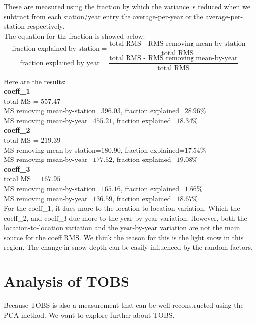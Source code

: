 \documentclass{article}
\begin{document}
These are measured using the fraction by which the variance is reduced when we subtract from each station/year entry the average-per-year or the average-per-station respectively. \\

The equation for the fraction is showed below:
\begin{equation*}
\textrm{fraction explained by station} = \frac{\textrm{total RMS - RMS removing mean-by-station}}{\textrm{total RMS}}
\end{equation*}
\begin{equation*}
\textrm{fraction explained by year} = \frac{\textrm{total RMS - RMS removing mean-by-year}}{\textrm{total RMS}}
\end{equation*}

Here are the results: \\

\textbf{coeff\_1} \\
total MS = $557.47$ \\
MS removing mean-by-station=$396.03$, fraction explained=$28.96\%$ \\
MS removing mean-by-year=$455.21$, fraction explained=$18.34\%$ \\

\textbf{coeff\_2} \\
total MS = $219.39$ \\
MS removing mean-by-station=$180.90$, fraction explained=$17.54\%$ \\
MS removing mean-by-year=$177.52$, fraction explained=$19.08\%$ \\

\textbf{coeff\_3} \\
total MS = $167.95$ \\
MS removing mean-by-station=$165.16$, fraction explained=$1.66\%$ \\
MS removing mean-by-year=$136.59$, fraction explained=$18.67\%$ \\

For the coeff\_1, it dues more to the location-to-location variation. Which the coeff\_2, and coeff\_3 due more to the year-by-year variation. However, both the location-to-location variation and the year-by-year variation are not the main source for the coeff RMS. We think the reason for this is the light snow in this region. The change in snow depth can be easily influenced by the random factors.



\section*{Analysis of TOBS}
Because TOBS is also a measurement that can be well reconstructed using the PCA method. We want to explore further about TOBS.\\
\end{document}
